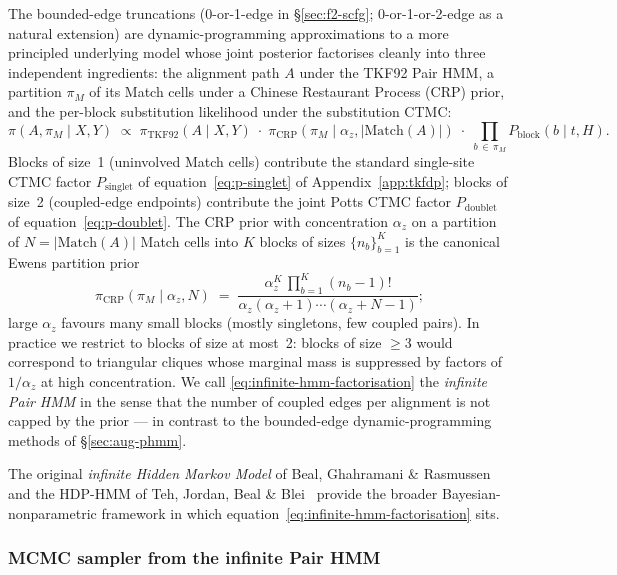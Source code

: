 The bounded-edge truncations (0-or-1-edge in \S\ref{sec:f2-scfg};
0-or-1-or-2-edge as a natural extension) are dynamic-programming
approximations to a more principled underlying model whose joint
posterior factorises cleanly into three independent ingredients:
the alignment path $A$ under the TKF92 Pair HMM, a partition
$\pi_{\!M}$ of its Match cells under a Chinese Restaurant Process
(CRP) prior, and the per-block substitution likelihood under the
substitution CTMC:
\begin{equation}
\label{eq:infinite-hmm-factorisation}
\pi(A, \pi_{\!M} \mid X, Y) \;\propto\; \pi_{\mathrm{TKF92}}(A \mid X, Y) \;\cdot\; \pi_{\mathrm{CRP}}(\pi_{\!M} \mid \alpha_z, |\mathrm{Match}(A)|) \;\cdot\; \prod_{b \,\in\, \pi_{\!M}} P_{\mathrm{block}}(b \mid t, H).
\end{equation}
Blocks of size~1 (uninvolved Match cells) contribute the standard
single-site CTMC factor $P_{\mathrm{singlet}}$ of
equation~\ref{eq:p-singlet} of Appendix~\ref{app:tkfdp}; blocks
of size~2 (coupled-edge endpoints) contribute the joint Potts
CTMC factor $P_{\mathrm{doublet}}$ of equation~\ref{eq:p-doublet}.
The CRP
prior with concentration $\alpha_z$ on a partition of
$N = |\mathrm{Match}(A)|$ Match cells into $K$ blocks of sizes
$\{n_b\}_{b=1}^K$ is the canonical Ewens partition
prior~\citep{ewens1972,pitmanyor1997}
\begin{equation}
\label{eq:crp-prior}
\pi_{\mathrm{CRP}}(\pi_{\!M} \mid \alpha_z, N) \;=\; \frac{\alpha_z^K \, \prod_{b=1}^K (n_b - 1)!}{\alpha_z (\alpha_z + 1) \cdots (\alpha_z + N - 1)};
\end{equation}
large $\alpha_z$ favours many small blocks (mostly singletons, few
coupled pairs). In practice we restrict to blocks of size at
most~2: blocks of size $\geq 3$ would correspond to triangular
cliques whose marginal mass is suppressed by factors of
$1/\alpha_z$ at high concentration. We call
\eqref{eq:infinite-hmm-factorisation} the \emph{infinite Pair HMM}
in the sense that the number of coupled edges per alignment is not
capped by the prior --- in contrast to the bounded-edge
dynamic-programming methods of \S\ref{sec:aug-phmm}.

The original \emph{infinite Hidden Markov Model} of Beal,
Ghahramani \& Rasmussen~\citep{bealghahramani2002} and the
HDP-HMM of Teh, Jordan, Beal \&
Blei~\citep{tehjordan2006} provide the broader Bayesian-nonparametric
framework in which equation~\ref{eq:infinite-hmm-factorisation}
sits.

\subsubsection*{MCMC sampler from the infinite Pair HMM}

